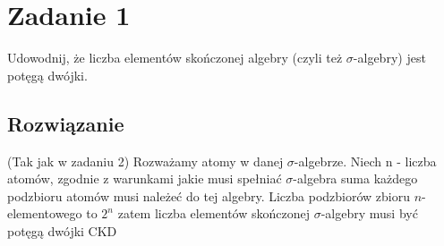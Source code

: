 \section{Zadanie 1}
Udowodnij, że liczba elementów skończonej algebry (czyli też \(\sigma\)-algebry) jest potęgą dwójki.

\subsection*{Rozwiązanie}
(Tak jak w zadaniu 2) Rozważamy atomy w danej \(\sigma\)-algebrze. Niech n - liczba atomów, zgodnie z warunkami jakie musi spełniać \(\sigma\)-algebra suma każdego podzbioru atomów musi należeć do tej algebry. Liczba podzbiorów zbioru \(n\)-elementowego to \(2^{n}\) zatem liczba elementów skończonej \(\sigma\)-algebry musi być potęgą dwójki CKD
